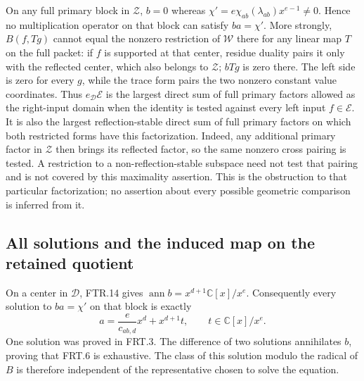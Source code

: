 On any full primary block in $\mathcal Z$, $b=0$ whereas
$\chi'=e\chi_{ab}(\lambda_{ab})x^{e-1}\ne0$. Hence no
multiplication operator on that block can satisfy $b a=\chi'$.
More strongly, $B(f,Tg)$ cannot equal the nonzero restriction of
$\mathcal W$ there for any linear map $T$ on the full packet:
if $f$ is supported at that center, residue duality pairs it only
with the reflected center, which also belongs to $\mathcal Z$;
$bTg$ is zero there. The left side is zero for every $g$, while
the trace form pairs the two nonzero constant value coordinates.
Thus $e_{\mathcal D}\mathcal E$ is the largest direct sum of full
primary factors allowed as the right-input domain when the identity
is tested against every left input $f\in\mathcal E$.
It is also the largest reflection-stable direct sum of full primary
factors on which both restricted forms have this factorization.
Indeed, any additional primary factor in $\mathcal Z$ then brings
its reflected factor, so the same nonzero cross pairing is tested.
A restriction to a non-reflection-stable subspace need not test that
pairing and is not covered by this maximality assertion.
This is the obstruction to that particular
factorization; no assertion about every possible geometric comparison
is inferred from it.

\subsection{All solutions and the induced map on the retained quotient}

On a center in $\mathcal D$, FTR.14 gives
$\operatorname{ann}b=x^{d+1}\mathbb C[x]/x^e$. Consequently
every solution to $b a=\chi'$ on that block is exactly
\[
 a=\frac{e}{c_{ab,d}}x^d+x^{d+1}t,\qquad
 t\in\mathbb C[x]/x^e.
 \tag{FRT.6}
\]
One solution was proved in FRT.3. The difference of two solutions
annihilates $b$, proving that FRT.6 is exhaustive. The class of
this solution modulo the radical of $B$ is therefore independent
of the representative chosen to solve the equation.

